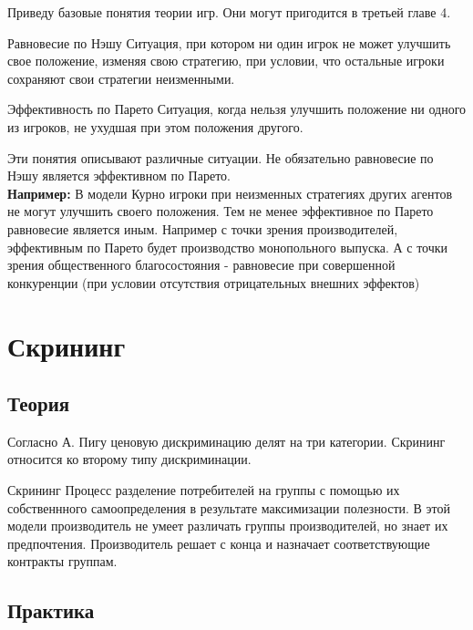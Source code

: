 \indent\setlength{\parindent}{1em}Приведу базовые понятия теории игр. Они могут пригодится в третьей главе 4.\smallskip

\begin{mybox}{Равновесие по Нэшу}
    Ситуация, при котором ни один игрок не может улучшить свое положение, изменяя свою стратегию, при условии, что
    остальные игроки сохраняют свои стратегии неизменными.
\end{mybox}

\begin{mybox}{Эффективность по Парето}
    Ситуация, когда нельзя улучшить положение ни одного из игроков, не ухудшая при этом положения другого.
\end{mybox}

Эти понятия описывают различные ситуации. Не обязательно равновесие по Нэшу является эффективном по Парето.
\smallskip\\\indent\setlength{\parindent}{1em} \textbf{Например:} В модели Курно игроки при неизменных стратегиях
других агентов не могут улучшить своего положения. Тем не менее эффективное по Парето равновесие является иным. Например
с точки зрения производителей, эффективным по Парето будет производство монопольного выпуска. А с точки зрения
общественного благосостояния - равновесие при совершенной конкуренции (при условии отсутствия отрицательных внешних
эффектов)

\newpage


\section{Скрининг}

\subsection{Теория}

\indent\setlength{\parindent}{1em} Согласно А. Пигу ценовую дискриминацию делят на три категории. Скрининг относится
ко второму типу дискриминации.\smallskip

\begin{mybox}{Скрининг}
    Процесс разделение потребителей на группы с помощью их собственнного самоопределения в результате максимизации
    полезности. В этой модели производитель не умеет различать группы производителей, но знает их предпочтения.
    Производитель решает с конца и назначает соответствующие контракты группам.
\end{mybox}


\subsection{Практика}

